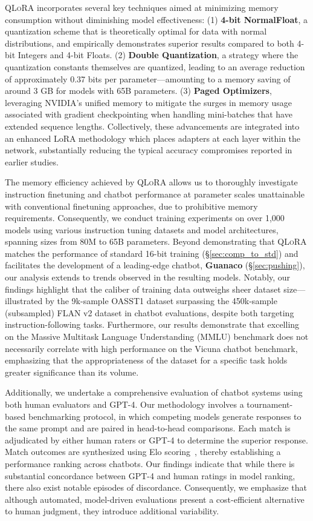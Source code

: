 \textsc{QLoRA} incorporates several key techniques aimed at minimizing memory consumption without diminishing model effectiveness: (1) \textbf{4-bit NormalFloat}, a quantization scheme that is theoretically optimal for data with normal distributions, and empirically demonstrates superior results compared to both 4-bit Integers and 4-bit Floats. (2) \textbf{Double Quantization}, a strategy where the quantization constants themselves are quantized, leading to an average reduction of approximately 0.37 bits per parameter—amounting to a memory saving of around 3 GB for models with 65B parameters. (3) \textbf{Paged Optimizers}, leveraging NVIDIA’s unified memory to mitigate the surges in memory usage associated with gradient checkpointing when handling mini-batches that have extended sequence lengths. Collectively, these advancements are integrated into an enhanced LoRA methodology which places adapters at each layer within the network, substantially reducing the typical accuracy compromises reported in earlier studies.

The memory efficiency achieved by \textsc{QLoRA} allows us to thoroughly investigate instruction finetuning and chatbot performance at parameter scales unattainable with conventional finetuning approaches, due to prohibitive memory requirements. Consequently, we conduct training experiments on over 1,000 models using various instruction tuning datasets and model architectures, spanning sizes from 80M to 65B parameters. Beyond demonstrating that \textsc{QLoRA} matches the performance of standard 16-bit training (\S\ref{sec:comp_to_std}) and facilitates the development of a leading-edge chatbot, \textbf{Guanaco} (\S\ref{sec:pushing}), our analysis extends to trends observed in the resulting models. Notably, our findings highlight that the caliber of training data outweighs sheer dataset size—illustrated by the 9k-sample OASST1 dataset surpassing the 450k-sample (subsampled) FLAN v2 dataset in chatbot evaluations, despite both targeting instruction-following tasks. Furthermore, our results demonstrate that excelling on the Massive Multitask Language Understanding (MMLU) benchmark does not necessarily correlate with high performance on the Vicuna chatbot benchmark, emphasizing that the appropriateness of the dataset for a specific task holds greater significance than its volume.

Additionally, we undertake a comprehensive evaluation of chatbot systems using both human evaluators and GPT-4. Our methodology involves a tournament-based benchmarking protocol, in which competing models generate responses to the same prompt and are paired in head-to-head comparisons. Each match is adjudicated by either human raters or GPT-4 to determine the superior response. Match outcomes are synthesized using Elo scoring~\citep{elo1967proposed, elo1978rating}, thereby establishing a performance ranking across chatbots. Our findings indicate that while there is substantial concordance between GPT-4 and human ratings in model ranking, there also exist notable episodes of discordance. Consequently, we emphasize that although automated, model-driven evaluations present a cost-efficient alternative to human judgment, they introduce additional variability.

